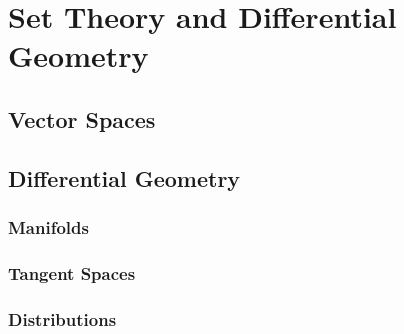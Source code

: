 
\chapter{Set Theory and Differential Geometry}

\section{Vector Spaces}\label{vectorspaces}

\clearpage

\section{Differential Geometry}
\subsection{Manifolds}
\subsection{Tangent Spaces}\label{tangentspaces}
\subsection{Distributions}
%